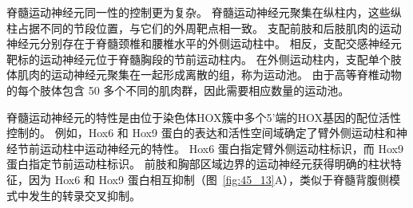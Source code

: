 脊髓运动神经元同一性的控制更为复杂。
脊髓运动神经元聚集在纵柱内，这些纵柱占据不同的节段位置，与它们的外周靶点相一致。
支配前肢和后肢肌肉的运动神经元分别存在于脊髓颈椎和腰椎水平的外侧运动柱中。
相反，支配交感神经元靶标的运动神经元位于脊髓胸段的节前运动柱内。
在外侧运动柱内，支配单个肢体肌肉的运动神经元聚集在一起形成离散的组，称为运动池。
由于高等脊椎动物的每个肢体包含 50 多个不同的肌肉群，因此需要相应数量的运动池。


脊髓运动神经元的特性是由位于染色体HOX簇中多个5'端的HOX基因的配位活性控制的。
例如，Hox6 和 Hox9 蛋白的表达和活性空间域确定了臂外侧运动柱和神经节前运动柱中运动神经元的特性。
Hox6 蛋白指定臂外侧运动柱标识，而 Hox9 蛋白指定节前运动柱标识。
前肢和胸部区域边界的运动神经元获得明确的柱状特征，因为 Hox6 和 Hox9 蛋白相互抑制（图~\ref{fig:45_13}A），类似于脊髓背腹侧模式中发生的转录交叉抑制。


